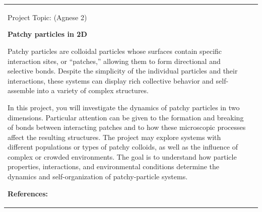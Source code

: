 \documentclass[a4paper,landscape]{article}
\newlength{\HeaderSize}
\newlength{\HeaderSizeBaseline}
\newlength{\SectionSize}
\newlength{\SectionSizeBaseline}
\newlength{\TextSize}
\newlength{\TextSizeBaseline}
\newlength{\vskipHeader}
\newlength{\vskipSection}
\newlength{\vskipText}
\newlength{\LeftPanel}
\newlength{\PanelGap}
\newlength{\RightPanel}
\begin{document}
\noindent
\begin{tabular}{@{}p{\LeftPanel}@{\hspace{\PanelGap}}p{\RightPanel}@{}}

\parbox[t][\LeftPanel][t]{\LeftPanel}{%

\begin{center}
  {\fontsize{\HeaderSize}{\HeaderSizeBaseline}\selectfont\color{topicblue}%
   Project Topic:\hspace{9mm} (Agnese 2)} 
\end{center}

\vspace{\vskipHeader}

{\fontsize{\SectionSize}{\SectionSizeBaseline}\selectfont\bfseries 
%
Patchy particles in 2D
\par}
\vspace{\vskipSection}

{\fontsize{\TextSize}{\TextSizeBaseline}\selectfont
%
Patchy particles are colloidal particles whose surfaces contain specific interaction sites, or “patches,” allowing them to form directional and selective bonds. Despite the simplicity of the individual particles and their interactions, these systems can display rich collective behavior and self-assemble into a variety of complex structures.
\par

\vspace{\vskipText}
In this project, you will investigate the dynamics of patchy particles in two dimensions. Particular attention can be given to the formation and breaking of bonds between interacting patches and to how these microscopic processes affect the resulting structures. The project may explore systems with different populations or types of patchy colloids, as well as the influence of complex or crowded environments. The goal is to understand how particle properties, interactions, and environmental conditions determine the dynamics and self-organization of patchy-particle systems.
\par
}

\vfill

{\fontsize{\SectionSize}{\SectionSizeBaseline}\selectfont\bfseries References: \par}
\vspace{\vskipSection}

}
\end{tabular}
\end{document}
